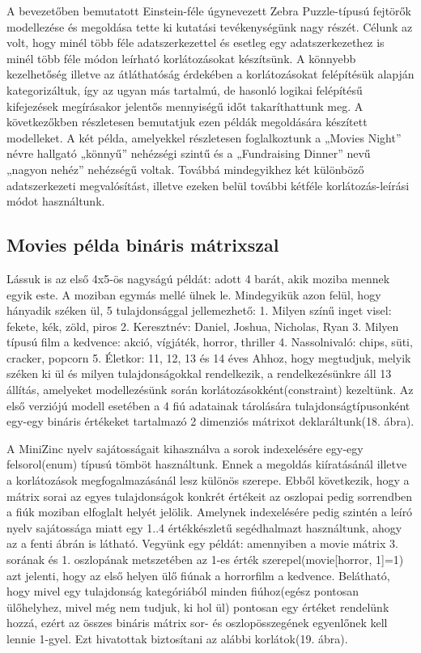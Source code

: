 \documentclass[12pt,a4paper,twoside, openright]{report}
\begin{document}
    A bevezetőben bemutatott Einstein-féle úgynevezett Zebra Puzzle-típusú fejtörők\cite{zebra} modellezése és megoldása tette ki kutatási tevékenységünk nagy részét.
    Célunk az volt, hogy minél több féle adatszerkezettel és esetleg egy adatszerkezethez is minél több féle módon leírható korlátozásokat készítsünk.
    A könnyebb kezelhetőség illetve az átláthatóság érdekében a korlátozásokat felépítésük alapján kategorizáltuk, így az ugyan más tartalmú, de hasonló logikai felépítésű kifejezések megírásakor jelentős mennyiségű időt takaríthattunk meg.
    A következőkben részletesen bemutatjuk ezen példák megoldására készített modelleket.
    A két példa, amelyekkel részletesen foglalkoztunk a „Movies Night” névre hallgató „könnyű” nehézségi szintű és a „Fundraising Dinner” nevű „nagyon nehéz” nehézségű voltak.
    Továbbá mindegyikhez két különböző adatszerkezeti megvalósítást, illetve ezeken belül további kétféle korlátozás-leírási módot használtunk.

\subsection{Movies példa bináris mátrixszal}

    Lássuk is az első 4x5-ös nagyságú példát: adott 4 barát, akik moziba mennek egyik este.
    A moziban egymás mellé ülnek le.
    Mindegyikük azon felül, hogy hányadik széken ül, 5 tulajdonsággal jellemezhető: 
    1.	Milyen színű inget visel: fekete, kék, zöld, piros
    2.	Keresztnév: Daniel, Joshua, Nicholas, Ryan
    3.	Milyen típusú film a kedvence: akció, vígjáték, horror, thriller
    4.	Nassolnivaló: chips, süti, cracker, popcorn
    5.	Életkor: 11, 12, 13 és 14 éves
    Ahhoz, hogy megtudjuk, melyik széken ki ül és milyen tulajdonságokkal rendelkezik, a rendelkezésünkre áll 13 állítás, amelyeket modellezésünk során korlátozásokként(constraint) kezeltünk.
    Az első verziójú modell esetében a 4 fiú adatainak tárolására tulajdonságtípusonként egy-egy bináris értékeket tartalmazó 2 dimenziós mátrixot deklaráltunk(18. ábra).


    A MiniZinc nyelv sajátosságait kihasználva a sorok indexelésére egy-egy felsorol(enum) típusú tömböt használtunk.
    Ennek a megoldás kiíratásánál illetve a korlátozások megfogalmazásánál lesz különös szerepe.
    Ebből következik, hogy a mátrix sorai az egyes tulajdonságok konkrét értékeit az oszlopai pedig sorrendben a fiúk moziban elfoglalt helyét jelölik.
    Amelynek indexelésére pedig szintén a leíró nyelv sajátossága miatt egy {1..4} értékkészletű segédhalmazt használtunk, ahogy az a fenti ábrán is látható.
    Vegyünk egy példát: amennyiben a movie mátrix 3. sorának és 1. oszlopának metszetében az 1-es érték szerepel(movie[horror, 1]=1) azt jelenti, hogy az első helyen ülő fiúnak a horrorfilm a kedvence.
    Belátható, hogy mivel egy tulajdonság kategóriából minden fiúhoz(egész pontosan ülőhelyhez, mivel még nem tudjuk, ki hol ül) pontosan egy értéket rendelünk hozzá, ezért az összes bináris mátrix sor- és oszlopösszegének egyenlőnek kell lennie 1-gyel.
    Ezt hivatottak biztosítani az alábbi korlátok(19. ábra).
\end{document}
